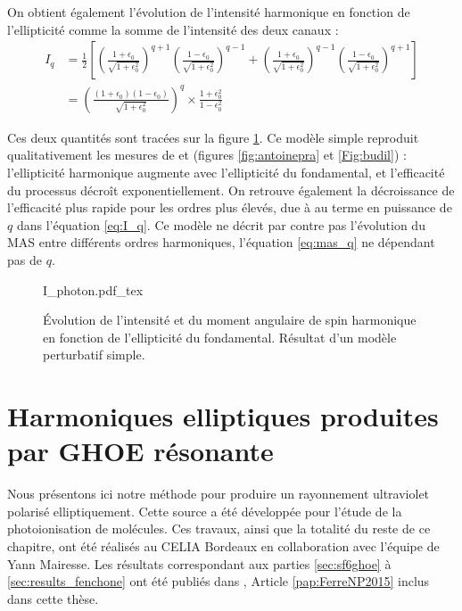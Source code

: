 On obtient également l'évolution de l'intensité harmonique en fonction de l'ellipticité comme la somme de l'intensité des deux canaux :
\begin{align}
I_q &= \frac{1}{2}\left[\left(\frac{1+\epsilon_0}{\sqrt{1+\epsilon_0^2}}\right)^{q+1}\left(\frac{1-\epsilon_0}{\sqrt{1+\epsilon_0^2}}\right)^{q-1}+\left(\frac{1+\epsilon_0}{\sqrt{1+\epsilon_0^2}}\right)^{q-1}\left(\frac{1-\epsilon_0}{\sqrt{1+\epsilon_0^2}}\right)^{q+1}\right]\nonumber\\
&= \left(\frac{(1+\epsilon_0)(1-\epsilon_0)}{\sqrt{1+\epsilon_0^2}}\right)^{q}\times\frac{1+\epsilon_0^2}{1-\epsilon_0^2}
\label{eq:I_q}
\end{align}

Ces deux quantités sont tracées sur la figure \ref{fig:mas_photon}. Ce modèle simple reproduit qualitativement les mesures de  et  (figures \ref{fig:antoinepra} et \ref{Fig:budil}) : l'ellipticité harmonique augmente avec l'ellipticité du fondamental, et l'efficacité du processus décroît exponentiellement. On retrouve également la décroissance de l'efficacité plus rapide pour les ordres plus élevés, due à au terme en puissance de $q$ dans l'équation \ref{eq:I_q}. Ce modèle ne décrit par contre pas l'évolution du MAS entre différents ordres harmoniques, l'équation \ref{eq:mas_q} ne dépendant pas de $q$.

\begin{figure}[!ht]
\centering
\def\svgwidth{1\columnwidth}
{I_photon.pdf_tex}
\caption{\'Evolution de l'intensité et du moment angulaire de spin harmonique en fonction de l'ellipticité du fondamental. Résultat d'un modèle perturbatif simple.}
\label{fig:mas_photon}
\end{figure}

\chapter{Harmoniques elliptiques produites par GHOE résonante}
Nous présentons ici notre méthode pour produire un rayonnement ultraviolet polarisé elliptiquement. Cette source a été développée pour l'étude de la photoionisation de molécules. Ces travaux, ainsi que la totalité du reste de ce chapitre, ont été réalisés au CELIA Bordeaux en collaboration avec l'équipe de Yann Mairesse. Les résultats correspondant aux parties \ref{sec:sf6ghoe} à \ref{sec:results_fenchone} ont été publiés dans , Article \ref{pap:FerreNP2015} inclus dans cette thèse.

